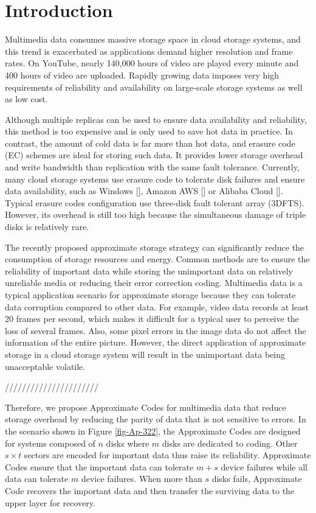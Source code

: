 \documentclass[sigconf]{acmart}
\begin{document}
\maketitle

\section{Introduction}
Multimedia data consumes massive storage space in cloud storage systems, and this trend is exacerbated as applications demand higher resolution and frame rates. On YouTube, nearly 140,000 hours of video are played every minute and 400 hours of video are uploaded. Rapidly growing data imposes very high requirements of reliability and availability on large-scale storage systems as well as low cost.

Although multiple replicas can be used to ensure data availability and reliability, this method is too expensive and is only used to save hot data in practice. In contrast, the amount of cold data is far more than hot data, and erasure code (EC) schemes are ideal for storing such data. It provides lower storage overhead and write bandwidth than replication with the same fault tolerance. Currently, many cloud storage systems use erasure code to tolerate disk failures and ensure data availability, such as Windows [], Amazon AWS [] or Alibaba Cloud []. Typical erasure codes configuration use three-disk fault tolerant array (3DFTS). However, its overhead is still too high because the simultaneous damage of triple disks is relatively rare. 

The recently proposed approximate storage strategy can significantly reduce the consumption of storage resources and energy. Common methods are to ensure the reliability of important data while storing the unimportant data on relatively unreliable media or reducing their error correction coding. Multimedia data is a typical application scenario for approximate storage because they can tolerate data corruption compared to other data. For example, video data records at least 20 frames per second, which makes it difficult for a typical user to perceive the loss of several frames. Also, some pixel errors in the image data do not affect the information of the entire picture. However, the direct application of approximate storage in a cloud storage system will result in the unimportant data being unacceptable volatile.

//////////////////////

Therefore, we propose Approximate Codes for multimedia data that reduce storage overhead by reducing the parity of data that is not sensitive to errors. In the scenario shown in Figure \ref{fig-Ap-322}, the Approximate Codes are designed for systems composed of $n$ disks where $m$ disks are dedicated to coding.
Other $s \times t$ sectors are encoded for important data thus raise its reliability. Approximate Codes ensure that the important data can tolerate $m+s$ device failures while all data can tolerate $m$ device failures.
When more than $s$ disks fails, Approximate Code recovers the important data and then transfer the surviving data to the upper layer for recovery. 
\end{document}
